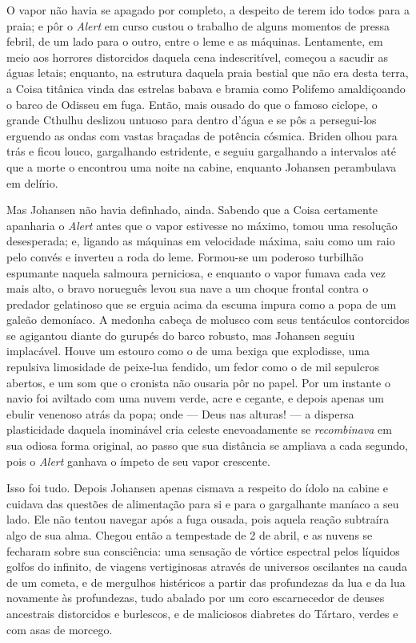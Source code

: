\begin{pages}
\begin{Rightside}
O vapor não havia se apagado por completo, a despeito de terem ido todos
para a praia; e pôr o \emph{Alert} em curso custou o trabalho de alguns
momentos de pressa febril, de um lado para o outro, entre o leme e as
máquinas. Lentamente, em meio aos horrores distorcidos daquela cena
indescritível, começou a sacudir as águas letais; enquanto, na estrutura
daquela praia bestial que não era desta terra, a Coisa titânica vinda
das estrelas babava e bramia como Polifemo amaldiçoando o barco de
Odisseu em fuga. Então, mais ousado do que o famoso ciclope, o grande
Cthulhu deslizou untuoso para dentro d'água e se pôs a persegui-los
erguendo as ondas com vastas braçadas de potência cósmica. Briden olhou
para trás e ficou louco, gargalhando estridente, e seguiu gargalhando a
intervalos até que a morte o encontrou uma noite na cabine, enquanto
Johansen perambulava em delírio.

Mas Johansen não havia definhado, ainda. Sabendo que a Coisa certamente
apanharia o \emph{Alert} antes que o vapor estivesse no máximo, tomou
uma resolução desesperada; e, ligando as máquinas em velocidade máxima,
saiu como um raio pelo convés e inverteu a roda do leme. Formou-se um
poderoso turbilhão espumante naquela salmoura perniciosa, e enquanto o
vapor fumava cada vez mais alto, o bravo norueguês levou sua nave a um
choque frontal contra o predador gelatinoso que se erguia acima da
escuma impura como a popa de um galeão demoníaco. A medonha cabeça de
molusco com seus tentáculos contorcidos se agigantou diante do gurupés
do barco robusto, mas Johansen seguiu implacável. Houve um estouro como
o de uma bexiga que explodisse, uma repulsiva limosidade de peixe-lua
fendido, um fedor como o de mil sepulcros abertos, e um som que o
cronista não ousaria pôr no papel. Por um instante o navio foi aviltado
com uma nuvem verde, acre e cegante, e depois apenas um ebulir venenoso
atrás da popa; onde --- Deus nas alturas! --- a dispersa plasticidade
daquela inominável cria celeste enevoadamente se \emph{recombinava} em
sua odiosa forma original, ao passo que sua distância se ampliava a cada
segundo, pois o \emph{Alert} ganhava o ímpeto de seu vapor crescente.

Isso foi tudo. Depois Johansen apenas cismava a respeito do ídolo na
cabine e cuidava das questões de alimentação para si e para o
gargalhante maníaco a seu lado. Ele não tentou navegar após a fuga
ousada, pois aquela reação subtraíra algo de sua alma. Chegou então a
tempestade de 2 de abril, e as nuvens se fecharam sobre sua consciência:
uma sensação de vórtice espectral pelos líquidos golfos do infinito, de
viagens vertiginosas através de universos oscilantes na cauda de um
cometa, e de mergulhos histéricos a partir das profundezas da lua e da
lua novamente às profundezas, tudo abalado por um coro escarnecedor de
deuses ancestrais distorcidos e burlescos, e de maliciosos diabretes do
Tártaro, verdes e com asas de morcego.


\end{Rightside}
\end{pages}

